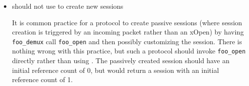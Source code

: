 \begin{itemize}
\item{}
\xDemux{} should not use \xOpen{} to create new sessions

It is common practice for a protocol to create passive sessions
(where session creation is triggered by an incoming packet rather than
an xOpen) by having {\tt foo\_demux} call {\tt foo\_open} and then
possibly customizing the session.
There is nothing wrong with this practice, but such a
protocol  should invoke {\tt foo\_open} directly rather
than using \xOpen{}.  The passively created session should have an
initial reference count of 0, but \xOpen{} would return a session
with an initial reference count of 1.

\end{itemize}


